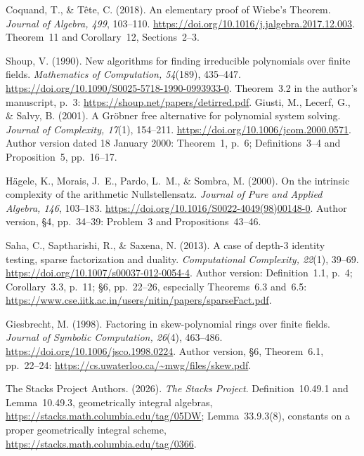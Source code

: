 Coquand, T., \& T\^ete, C. (2018).
An elementary proof of Wiebe's Theorem.
\emph{Journal of Algebra, 499}, 103--110.
\url{https://doi.org/10.1016/j.jalgebra.2017.12.003}.
Theorem~11 and Corollary~12, Sections~2--3.

Shoup, V. (1990).
New algorithms for finding irreducible polynomials over finite fields.
\emph{Mathematics of Computation, 54}(189), 435--447.
\url{https://doi.org/10.1090/S0025-5718-1990-0993933-0}.
Theorem~3.2 in the author's manuscript, p.~3:
\url{https://shoup.net/papers/detirred.pdf}.
Giusti, M., Lecerf, G., \& Salvy, B. (2001).
A Gr\"obner free alternative for polynomial system solving.
\emph{Journal of Complexity, 17}(1), 154--211.
\url{https://doi.org/10.1006/jcom.2000.0571}.
Author version dated 18 January 2000: Theorem~1, p.~6;
Definitions~3--4 and Proposition~5, pp.~16--17.

H\"agele, K., Morais, J.~E., Pardo, L.~M., \& Sombra, M. (2000).
On the intrinsic complexity of the arithmetic Nullstellensatz.
\emph{Journal of Pure and Applied Algebra, 146}, 103--183.
\url{https://doi.org/10.1016/S0022-4049(98)00148-0}.
Author version, \S4, pp.~34--39: Problem~3 and Propositions~43--46.

Saha, C., Saptharishi, R., \& Saxena, N. (2013).
A case of depth-3 identity testing, sparse factorization and duality.
\emph{Computational Complexity, 22}(1), 39--69.
\url{https://doi.org/10.1007/s00037-012-0054-4}.
Author version: Definition~1.1, p.~4; Corollary~3.3, p.~11;
\S6, pp.~22--26, especially Theorems~6.3 and~6.5:
\url{https://www.cse.iitk.ac.in/users/nitin/papers/sparseFact.pdf}.

Giesbrecht, M. (1998).
Factoring in skew-polynomial rings over finite fields.
\emph{Journal of Symbolic Computation, 26}(4), 463--486.
\url{https://doi.org/10.1006/jsco.1998.0224}.
Author version, \S6, Theorem~6.1, pp.~22--24:
\url{https://cs.uwaterloo.ca/~mwg/files/skew.pdf}.

The Stacks Project Authors. (2026).
\emph{The Stacks Project}.
Definition~10.49.1 and Lemma~10.49.3, geometrically integral algebras,
\url{https://stacks.math.columbia.edu/tag/05DW};
Lemma~33.9.3(8), constants on a proper geometrically integral scheme,
\url{https://stacks.math.columbia.edu/tag/0366}.

